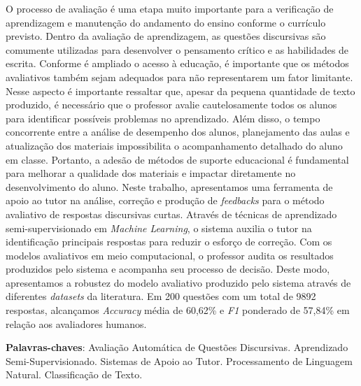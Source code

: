 O processo de avaliação é uma etapa muito importante para a verificação de aprendizagem e manutenção do andamento do ensino conforme o currículo previsto. Dentro da avaliação de aprendizagem, as questões discursivas são comumente utilizadas para desenvolver o pensamento crítico e as habilidades de escrita. Conforme é ampliado o acesso à educação, é importante que os métodos avaliativos também sejam adequados para não representarem um fator limitante. Nesse aspecto é importante ressaltar que, apesar da pequena quantidade de texto produzido, é necessário que o professor avalie cautelosamente todos os alunos para identificar possíveis problemas no aprendizado. Além disso, o tempo concorrente entre a análise de desempenho dos alunos, planejamento das aulas e atualização dos materiais impossibilita o acompanhamento detalhado do aluno em classe. Portanto, a adesão de métodos de suporte educacional é fundamental para melhorar a qualidade dos materiais e impactar diretamente no desenvolvimento do aluno. Neste trabalho, apresentamos uma ferramenta de apoio ao tutor na análise, correção e produção de \textit{feedbacks} para o método avaliativo de respostas discursivas curtas. Através de técnicas de aprendizado semi-supervisionado em \textit{Machine Learning}, o sistema auxilia o tutor na identificação principais respostas para reduzir o esforço de correção. Com os modelos avaliativos em meio computacional, o professor audita os resultados produzidos pelo sistema e acompanha seu processo de decisão. Deste modo, apresentamos a robustez do modelo avaliativo produzido pelo sistema através de diferentes \textit{datasets} da literatura. Em 200 questões com um total de 9892 respostas, alcançamos \textit{Accuracy} média de 60,62\% e \textit{F1} ponderado de 57,84\% em relação aos avaliadores humanos.

\textbf{Palavras-chaves}: Avaliação Automática de Questões Discursivas. Aprendizado Semi-Supervisionado. Sistemas de Apoio ao Tutor. Processamento de Linguagem Natural. Classificação de Texto.